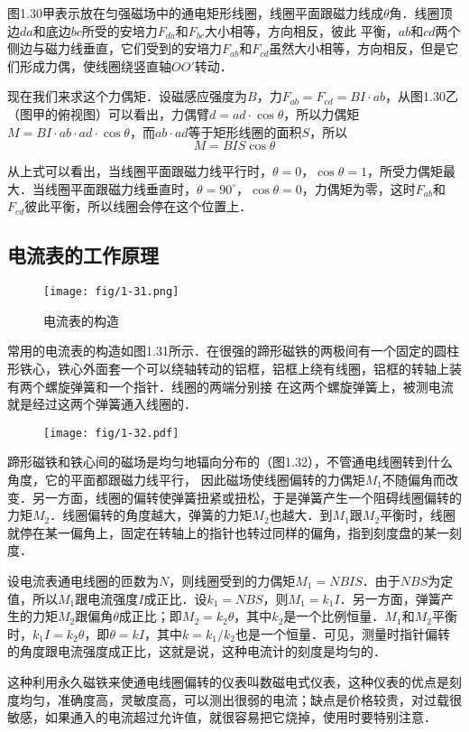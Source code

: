 图1.30甲表示放在匀强磁场中的通电矩形线圈，线圈平面跟磁力线成$\theta$角．线圈顶边$da$和底边$bc$所受的安培力$F_{da}$和$F_{bc}$大小相等，方向相反，彼此
平衡，$ab$和$cd$两个侧边与磁力线垂直，它们受到的安培力$F_{ab}$和$F_{cd}$虽然大小相等，方向相反，但是它们形成力偶，使线圈绕竖直轴$OO'$转动．

现在我们来求这个力偶矩．设磁感应强度为$B$，力$F_{ab}=
F_{cd}=BI·ab$，从图1.30乙（图甲的俯视图）可以看出，力偶臂$d=ad\cdot \cos\theta$，所以力偶矩$M=BI\cdot ab\cdot ad\cdot \cos\theta$，而$ab\cdot ad$等于矩形线圈的面积$S$，所以$$M=BIS\cos\theta$$

从上式可以看出，当线圈平面跟磁力线平行时，$\theta=0$，$\cos\theta=1$，所受力偶矩最大．当线圈平面跟磁力线垂直时，$\theta=90^{\circ}$，$\cos\theta=0$，力偶矩为零，这时$F_{ab}$和$F_{cd}$彼此平衡，所以线圈会停在这个位置上．

\subsection{电流表的工作原理}
    \begin{figure}[htp]\centering
	\texttt{[image: fig/1-31.png]}
	\caption{电流表的构造}
\end{figure}
常用的电流表的构造如图1.31所示．在很强的蹄形磁铁的两极间有一个固定的圆柱形铁心，铁心外面套一个可以绕轴转动的铝框，铝框上绕有线圈，铝框的转轴上装有两个螺旋弹簧和一个指针．线圈的两端分别接
在这两个螺旋弹簧上，被测电流就是经过这两个弹簧通入线圈的．
\begin{figure}[htp]\centering
\texttt{[image: fig/1-32.pdf]}
\caption{}
\end{figure}

蹄形磁铁和铁心间的磁场是均匀地辐向分布的（图1.32），不管通电线圈转到什么角度，它的平面都跟磁力线平行，
因此磁场使线圈偏转的力偶矩$M_1$不随偏角而改变．另一方面，线圈的偏转使弹簧扭紧或扭松，于是弹簧产生一个阻碍线圈偏转的力矩$M_2$．线圈偏转的角度越大，弹簧的力矩$M_2$也越大．到$M_1$跟$M_2$平衡时，线圈就停在某一偏角上，固定在转轴上的指针也转过同样的偏角，指到刻度盘的某一刻度．

设电流表通电线圈的匝数为$N$，则线圈受到的力偶矩$M_1=NBIS$．由于$NBS$为定值，所以$M_1$跟电流强度$I$成正比．设$k_1=NBS$，则$M_1=k_1I$．另一方面，弹簧产生的力矩$M_2$跟偏角$\theta$成正比；即$M_2=k_2\theta$，其中$k_2$是一个比例恒量．$M_1$和$M_2$平衡时，$k_1I=k_2\theta$，即$\theta =kI$，其中$k=k_1/k_2$也是一个恒量．可见，测量时指针偏转的角度跟电流强度成正比，这就是说，这种电流计的刻度是均匀的．

这种利用永久磁铁来使通电线圈偏转的仪表叫数磁电式仪表，这种仪表的优点是刻度均匀，准确度高，灵敏度高，可以测出很弱的电流；缺点是价格较贵，对过载很敏感，如果通入的电流超过允许值，就很容易把它烧掉，使用时要特别注意．

